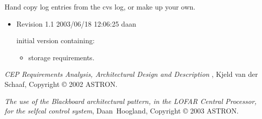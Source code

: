 \documentclass[]{lofar}
\begin{document}
\appendix

  \label{app:assumptions}\hypertarget{app:assumptions}{}


  \label{app:prerequisites}\hypertarget{app:prerequisites}{}


  \label{app:requirements-list}\hypertarget{app:requirements-list}{}%


  \printindex

  \label{app:revision-log}\hypertarget{app:revision-log}{}%

    Hand copy log entries from the cvs log, or make up your own.

    \begin{itemize}

      \item 

        Revision 1.1 2003/06/18 12:06:25 daan

        initial version containing:
        \begin{itemize}

	  \item 

            storage requirements.

        \end{itemize}

    \end{itemize}

  
  \begin{thebibliography}{WIDELABEL}

      \emph{CEP Requirements Analysis, Architectural Design and
      Description} , Kjeld van der Schaaf, Copyright \copyright{} 2002
      ASTRON.

      \emph{The use of the Blackboard architectural pattern, in the LOFAR Central Processor, for the selfcal control system},
      Daan\ Hoogland,
      Copyright \copyright{} 2003 ASTRON.

  \end{thebibliography}
\end{document}
